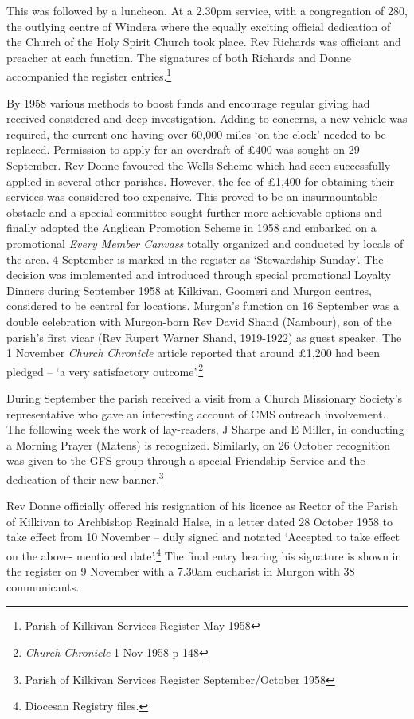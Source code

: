 This was followed by a luncheon. At a 2.30pm service, with a
congregation of 280, the outlying centre of Windera where the equally
exciting official dedication of the Church of the Holy Spirit Church
took place. Rev Richards was officiant and preacher at each function.
The signatures of both Richards and Donne accompanied the register
entries.\footnote{Parish of Kilkivan Services Register May 1958}

By 1958 various methods to boost funds and encourage regular giving had
received considered and deep investigation. Adding to concerns, a new
vehicle was required, the current one having over 60,000 miles `on the
clock' needed to be replaced. Permission to apply for an overdraft of
\pounds400 was sought on 29 September. Rev Donne favoured the Wells Scheme
which had seen successfully applied in several other parishes. However,
the fee of \pounds1,400 for obtaining their services was considered too
expensive. This proved to be an insurmountable obstacle and a special
committee sought further more achievable options and finally adopted the
Anglican Promotion Scheme in 1958 and embarked on a promotional
\emph{Every Member Canvass} totally organized and conducted by locals of
the area. 4 September is marked in the register as `Stewardship Sunday'.
The decision was implemented and introduced through special promotional
Loyalty Dinners during September 1958 at Kilkivan, Goomeri and Murgon
centres, considered to be central for locations. Murgon's function on 16
September was a double celebration with Murgon-born Rev David Shand
(Nambour), son of the parish's first vicar (Rev Rupert Warner Shand,
1919-1922) as guest speaker. The 1 November \emph{Church Chronicle}
article reported that around \pounds1,200 had been pledged -- `a very
satisfactory outcome'.\footnote{\emph{Church Chronicle} 1 Nov 1958 p 148}

During September the parish received a visit from a Church Missionary
Society's representative who gave an interesting account of CMS outreach
involvement. The following week the work of lay-readers, J Sharpe and E
Miller, in conducting a Morning Prayer (Matens) is recognized.
Similarly, on 26 October recognition was given to the GFS group through
a special Friendship Service and the dedication of their new
banner.\footnote{Parish of Kilkivan Services Register September/October
  1958}

Rev Donne officially offered his resignation of his licence as Rector of
the Parish of Kilkivan to Archbishop Reginald Halse, in a letter dated
28 October 1958 to take effect from 10 November -- duly signed and
notated `Accepted to take effect on the above- mentioned
date'.\footnote{Diocesan Registry files.} The final entry bearing his
signature is shown in the register on 9 November with a 7.30am eucharist
in Murgon with 38 communicants.

